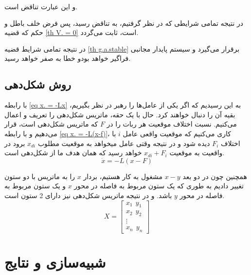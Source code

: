 و این عبارت تناقض است.

در نتیجه تمامی شرایطی که در نظر گرفتیم، به تناقض رسید، پس فرض خلف باطل و حکم که قضیه \ref{th V. = 0} است، ثابت می‌گردد.

در نتیجه تمامی شرایط قضیه \ref{th g.a.stable} برقرار می‌گیرد و سیستم پایدار مجانبی فراگیر خواهد بودو خطا به صفر خواهد رسید.

\subsection{روش شکل‌دهی}
با رابطه \ref{eq x. = -Lx} به این رسیدیم که اگر یکی از عامل‌ها را رهبر در نظر بگیریم، بقیه آن را دنبال خواهند کرد. حال با یک حقه، ماتریس شکل‌دهی را تعریف و اعمال می‌کنیم. نسبت اختلاف موقعیت هر ربات را در $F$ که ماتریس شکل‌دهی است، قرار می‌دهیم و با رابطه \ref{eq x. = -L(x-f)}، کاری می‌کنیم که موقعیت واقعی عامل $i$ با اختلاف $F_i$ دیده شود و در نتیجه وقتی عامل میخواهد به موقعیت مطلوب $x_{di}$ برود در واقعیت به موقعیت $x_{di} + F_i$ خواهد رسید که همان هدف ما از شکل‌دهی است.
\begin{equation}\label{eq x. = -L(x-f)}
	\dot{x} = -L(x-F)
\end{equation} 

همچنین چون در دو بعد $x-y$ مشغول به کار هستیم، بردار $x$ را به ماتریس با دو ستون تغییر دادیم به طوری که یک ستون مربوط به فاصله در محور $x$ و یک ستون مربوط به فاصله در محور $y$ باشد. و در نتیجه ماتریس شکل‌دهی نیز دارای 2 ستون است.
\begin{equation}\label{eq X = [x y]}
	X = 
	\begin{bmatrix}
	x_1~~ y_1 \\
	x_2~~ y_2 \\
	\vdots \\
	x_n ~~y_n
	\end{bmatrix}
\end{equation}

\section{شبیه‌سازی و نتایج}





